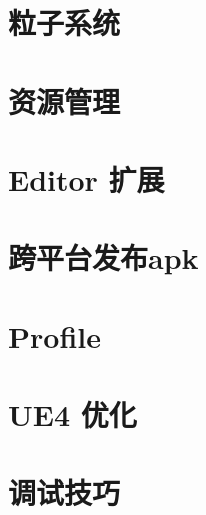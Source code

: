 \documentclass[UTF8,a4paper,12pt]{ctexbook}
\begin{document}
	
	
\chapter{粒子系统}
							
\chapter{资源管理}

\chapter{Editor 扩展}
		
\chapter{跨平台发布apk}

\chapter{Profile}
	
\chapter{UE4 优化}

\chapter{调试技巧}
	
	
	
	
	
\end{document}
